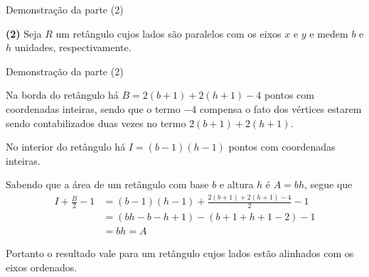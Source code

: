 \begin{frame}[fragile]{Demonstração da parte (2)}

    \textbf{(2)} Seja $R$ um retângulo cujos lados são paralelos com os eixos $x$ e $y$ e medem
        $b$ e $h$ unidades, respectivamente.

    \begin{figure}
        \centering

    \end{figure}


\end{frame}

\begin{frame}[fragile]{Demonstração da parte (2)}

    Na borda do retângulo há $B = 2(b + 1) + 2(h + 1) - 4$ pontos com coordenadas inteiras, sendo 
    que o termo $-4$ compensa o fato dos vértices estarem sendo contabilizados duas vezes 
    no termo $2(b + 1) + 2(h + 1)$.

    No interior do retângulo há $I = (b - 1)(h - 1)$ pontos com coordenadas inteiras.

    Sabendo que a área de um retângulo com base $b$ e altura $h$ é $A = bh$, segue que
    \begin{align*}
        I + \frac{B}{2} - 1 &= (b - 1)(h - 1) + \frac{2(b + 1) + 2(h + 1) - 4}{2} - 1 \\
        &= (bh - b - h + 1) - (b + 1 + h + 1 - 2) - 1 \\
        &= bh = A
    \end{align*}

    Portanto o resultado vale para um retângulo cujos lados estão alinhados com os eixos
    ordenados.
\end{frame}

